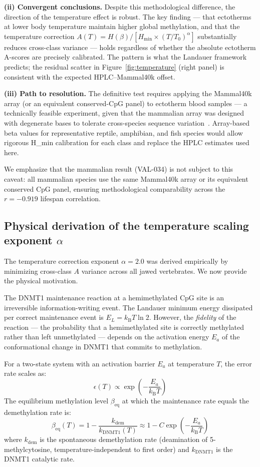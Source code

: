 \documentclass[11pt,a4paper]{article}
\newcommand{\Hmin}{H_{\min}}
\newcommand{\Ascore}{A}
\newcommand{\kB}{k_{\mathrm{B}}}
\begin{document}
\textbf{(ii) Convergent conclusions.} Despite this methodological difference,
the direction of the temperature effect is robust. The key finding --- that
ectotherms at lower body temperature maintain higher global methylation,
and that the temperature correction $A(T) = H(\beta)/[\Hmin \times (T/T_0)^\alpha]$
substantially reduces cross-class variance --- holds regardless of whether the
absolute ectotherm A-scores are precisely calibrated. The pattern is what
the Landauer framework predicts; the residual scatter in Figure~\ref{fig:temperature}
(right panel) is consistent with the expected HPLC--Mammal40k offset.

\textbf{(iii) Path to resolution.} The definitive test requires applying
the Mammal40k array (or an equivalent conserved-CpG panel) to ectotherm
blood samples --- a technically feasible experiment, given that the mammalian
array was designed with degenerate bases to tolerate cross-species sequence
variation~\citep{Arneson2022}. Array-based beta values for representative
reptile, amphibian, and fish species would allow rigorous H_min calibration
for each class and replace the HPLC estimates used here.

We emphasize that the mammalian result (VAL-034) is not subject to this caveat:
all mammalian species use the same Mammal40k array or its equivalent conserved
CpG panel, ensuring methodological comparability across the $r = -0.919$ lifespan
correlation.

\subsection{Physical derivation of the temperature scaling exponent $\alpha$}
\label{sec:alpha}

The temperature correction exponent $\alpha = 2.0$ was derived empirically
by minimizing cross-class $\Ascore$ variance across all jawed vertebrates.
We now provide the physical motivation.

The DNMT1 maintenance reaction at a hemimethylated CpG site is an irreversible
information-writing event. The Landauer minimum energy dissipated per correct
maintenance event is $E_L = \kB T \ln 2$. However, the \emph{fidelity} of the
reaction --- the probability that a hemimethylated site is correctly methylated
rather than left unmethylated --- depends on the activation energy $E_a$ of
the conformational change in DNMT1 that commits to methylation.

For a two-state system with an activation barrier $E_a$ at temperature $T$,
the error rate scales as:
\begin{equation}
\epsilon(T) \propto \exp\!\left(-\frac{E_a}{\kB T}\right)
\end{equation}
The equilibrium methylation level $\beta_{\mathrm{eq}}$ at which the
maintenance rate equals the demethylation rate is:
\begin{equation}
\beta_{\mathrm{eq}}(T) = 1 - \frac{k_{\mathrm{dem}}}{k_{\mathrm{DNMT1}}(T)}
\approx 1 - C \exp\!\left(-\frac{E_a}{\kB T}\right)
\end{equation}
where $k_{\mathrm{dem}}$ is the spontaneous demethylation rate (deamination
of 5-methylcytosine, temperature-independent to first order) and $k_{\mathrm{DNMT1}}$
is the DNMT1 catalytic rate.
\end{document}

